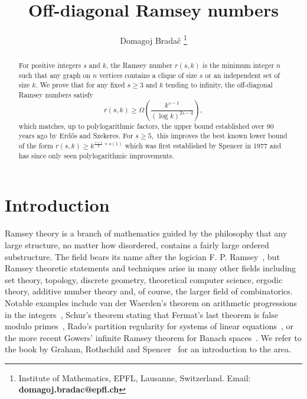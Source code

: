 \documentclass{article}
\title{Off-diagonal Ramsey numbers}
\author{Domagoj Brada\v{c} \thanks{Institute of Mathematics, EPFL, Lausanne, Switzerland. Email: \textbf{domagoj.bradac@epfl.ch}}}
\date{}
\theoremstyle{plain}
\theoremstyle{definition}
\begin{document}
\maketitle

\begin{abstract}
    For positive integers $s$ and $k$, the Ramsey number $r(s,k)$ is the minimum integer $n$ such that any graph on $n$ vertices contains a clique of size $s$ or an independent set of size $k$. We prove that for any fixed $s \ge 3$ and $k$ tending to infinity, the off-diagonal Ramsey numbers satisfy 
    \[ r(s, k) \ge \Omega \left(\frac{k^{s-1}}{(\log k)^{2s-4}} \right), \] which matches, up to polylogarithmic factors, the upper bound established over 90 years ago by Erd\H{o}s and Szekeres. For $s \ge 5,$ this improves the best known lower bound of the form $r(s, k) \ge k^{\frac{s+1}{2} + o(1)}$ which was first established by Spencer in 1977 and has since only seen polylogarithmic improvements.
\end{abstract}

\section{Introduction}
Ramsey theory is a branch of mathematics guided by the philosophy that any large structure, no matter how disordered, contains a fairly large ordered substructure. The field bears its name after the logician F. P. Ramsey~\cite{ramsey}, but Ramsey theoretic statements and techniques arise in many other fields including set theory, topology, discrete geometry, theoretical computer science, ergodic theory, additive number theory and, of course, the larger field of combinatorics. Notable examples include van der Waerden's theorem on arithmetic progressions in the integers~\cite{vanderwaerden}, Schur's theorem stating that Fermat's last theorem is false modulo primes~\cite{schur}, Rado's partition regularity for systems of linear equations~\cite{rado-partition}, or the more recent Gowers' infinite Ramsey theorem for Banach spaces~\cite{gowers-banach}.  We refer to the book by Graham, Rothschild and Spencer~\cite{graham-rothschild-spencer} for an introduction to the area.
\end{document}
